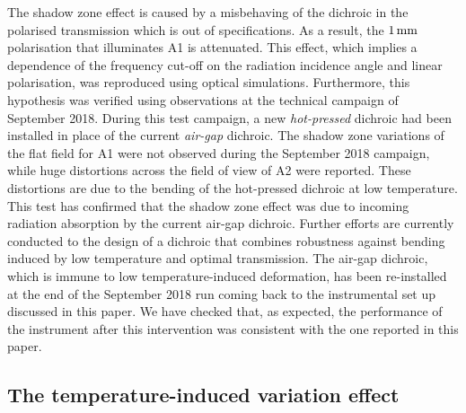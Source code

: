 The shadow zone effect is caused by {\lp a misbehaving of the dichroic in
the polarised transmission which is out of specifications. As a
result, the $1\,\rm{mm}$ polarisation that illuminates A1 is
attenuated.}
This effect,
which implies %
{\lp a dependence of the frequency cut-off on the radiation
incidence angle and linear polarisation,}
was reproduced using optical simulations. Furthermore, this hypothesis was
verified using observations at the technical campaign of September
2018. During this test campaign, a new \emph{hot-pressed} dichroic had
been installed in place of the current \emph{air-gap} dichroic.
%
%
The shadow zone variations of the flat field for A1 were
not observed during the September 2018 campaign, while huge distortions
across the field of view of A2 were reported. These distortions are
due to the bending of the hot-pressed dichroic at low temperature.
This test has confirmed that the shadow zone effect was due
to incoming radiation absorption by the current air-gap dichroic.
Further efforts are currently conducted to the design of a dichroic that
combines robustness against bending induced by low temperature and
optimal transmission.
{\lp The air-gap dichroic, which is immune to low temperature-induced
deformation, has been re-installed at the end of the September 2018
run coming back to the instrumental set up discussed in this paper. We
have checked that, as expected, the performance of the instrument
after this intervention was consistent with the one reported in this
paper.}


\subsection{The temperature-induced variation effect}
\label{se:beam_variation}

